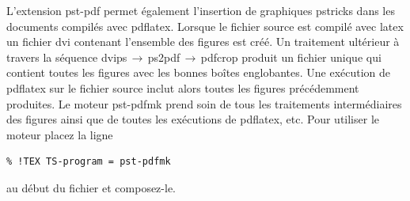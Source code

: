 \documentclass[11pt,french]{article}
\newcommand{\TS}{\textsf{\TeX Shop}}
\newcommand{\latexmk}{\textsf{latexmk}}
\newcommand{\cmd}[1]{\textsf{#1}}
\newcommand{\To}{\,\(\to\)\,}
\begin{document}
L'extension \cmd{pst-pdf} permet également l'insertion de graphiques \cmd{pstricks} dans les documents compilés avec \cmd{pdflatex}. Lorsque le fichier source est compilé avec \cmd{latex} un fichier \cmd{dvi} contenant l'ensemble des figures est créé. Un traitement ultérieur à travers la séquence \cmd{dvips}\To\cmd{ps2pdf}\To\cmd{pdfcrop} produit un fichier unique qui contient toutes les figures avec les bonnes boîtes englobantes. Une exécution de \cmd{pdflatex} sur le fichier source inclut alors toutes les figures précédemment produites. Le moteur \cmd{pst-pdfmk} prend soin de tous les traitements intermédiaires des figures ainsi que de toutes les exécutions de \cmd{pdflatex}, etc. Pour utiliser le moteur placez la ligne
\begin{verbatim}
% !TEX TS-program = pst-pdfmk
\end{verbatim}
au début du fichier et composez-le. 

%
%
\end{document}
